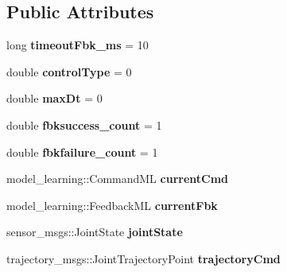 \subsection*{Public Attributes}
\begin{DoxyCompactItemize}
\item 
long {\bfseries timeout\+Fbk\+\_\+ms} = 10\hypertarget{classarmcontroller_a78f7a3b674725073c109e330da297e0f}{}\label{classarmcontroller_a78f7a3b674725073c109e330da297e0f}

\item 
double {\bfseries control\+Type} = 0\hypertarget{classarmcontroller_a3e976e7013c9800f7e7c4cbeb897ff9f}{}\label{classarmcontroller_a3e976e7013c9800f7e7c4cbeb897ff9f}

\item 
double {\bfseries max\+Dt} = 0\hypertarget{classarmcontroller_adc3f62b4ca8f4665be0d895cfe90d5e5}{}\label{classarmcontroller_adc3f62b4ca8f4665be0d895cfe90d5e5}

\item 
double {\bfseries fbksuccess\+\_\+count} = 1\hypertarget{classarmcontroller_a4893f1563d325e4483933239686cd1af}{}\label{classarmcontroller_a4893f1563d325e4483933239686cd1af}

\item 
double {\bfseries fbkfailure\+\_\+count} = 1\hypertarget{classarmcontroller_a1b2fc37dfd0c502c3ced7115d11c99bb}{}\label{classarmcontroller_a1b2fc37dfd0c502c3ced7115d11c99bb}

\item 
model\+\_\+learning\+::\+Command\+ML {\bfseries current\+Cmd}\hypertarget{classarmcontroller_a6f645096fbb56f5856ba7372faf8f6ee}{}\label{classarmcontroller_a6f645096fbb56f5856ba7372faf8f6ee}

\item 
model\+\_\+learning\+::\+Feedback\+ML {\bfseries current\+Fbk}\hypertarget{classarmcontroller_a0403b6deaea205c1f33768307e0b121e}{}\label{classarmcontroller_a0403b6deaea205c1f33768307e0b121e}

\item 
sensor\+\_\+msgs\+::\+Joint\+State {\bfseries joint\+State}\hypertarget{classarmcontroller_a7da9e0e8c6228e5cbce003cb40c5170e}{}\label{classarmcontroller_a7da9e0e8c6228e5cbce003cb40c5170e}

\item 
trajectory\+\_\+msgs\+::\+Joint\+Trajectory\+Point {\bfseries trajectory\+Cmd}\hypertarget{classarmcontroller_ac67171ad306ca94cb45a807673c16a03}{}\label{classarmcontroller_ac67171ad306ca94cb45a807673c16a03}


\end{DoxyCompactItemize}
